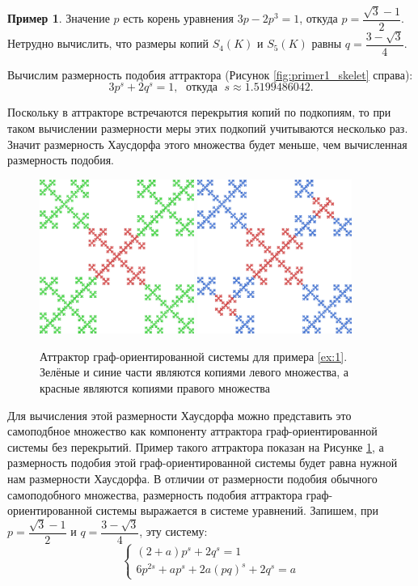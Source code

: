 \documentclass[a4paper,14pt]{extarticle} %
\newcommand{\0}{\varnothing}
\newcommand{\8}{\infty}
\theoremstyle{definition}
\newtheorem{example}{Пример}
\begin{document}
\begin{example}
Значение $p$ есть корень уравнения $3p-2p^3=1$, откуда $p=\dfrac{\sqrt{3}-1}{2}$. 
Нетрудно вычислить, что размеры копий $S_4(K)$ и $S_5(K)$ равны $q=\dfrac{3-\sqrt{3}}{4}$.

Вычислим размерность подобия аттрактора (Рисунок \ref{fig:primer1_skelet} справа):
$$3p^s+2q^s=1,\;\text{ откуда }\; s\approx1.5199486042.$$

Поскольку в аттракторе встречаются перекрытия копий по подкопиям, то при таком вычислении размерности меры этих подкопий учитываются несколько раз. 
Значит размерность Хаусдорфа этого множества будет меньше, чем вычисленная размерность подобия. 

\begin{figure}[H]
\centering
\includegraphics[width=0.45\textwidth]{3_2_1.png}
\hfill
\includegraphics[width=0.45\textwidth]{3_2_2.png}
\begin{minipage}{0.85\textwidth}
\caption{Аттрактор граф-ориентированной системы для примера \ref{ex:1}. Зелёные и синие части являются копиями левого множества, а красные являются копиями правого множества}
\label{fig:primer1_1_2}
\end{minipage}
\end{figure}


Для вычисления этой размерности Хаусдорфа можно представить это самоподбное множество как компоненту аттрактора граф-ори\-ен\-ти\-ро\-ван\-ной системы без перекрытий. 
Пример такого аттрактора показан на Рисунке \ref{fig:primer1_1_2}, а размерность подобия этой граф-ори\-ен\-ти\-ро\-ван\-ной системы будет равна нужной нам размерности Хаусдорфа.
В отличии от размерности подобия обычного самоподобного множества, размерность подобия аттрактора граф-ори\-ен\-ти\-ро\-ван\-ной системы выражается в системе уравнений.
Запишем, при $p=\dfrac{\sqrt{3}-1}{2}$ и $q=\dfrac{3-\sqrt{3}}{4}$, эту систему:
$$
\begin{cases}
(2+a)p^s+2q^s=1\\
6p^{2s}+ap^s+2a(pq)^s+2q^s=a
\end{cases}
$$


\end{example}
\end{document}
